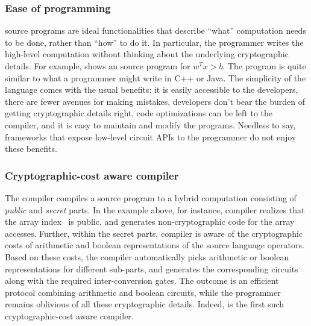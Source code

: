 \subsubsection{Ease of programming} \tool source programs are ideal
functionalities that describe ``what'' computation needs to be done,
rather than ``how'' to do it. In particular, the programmer writes the
high-level computation without thinking about the underlying
cryptographic details. For example, 
shows an \tool source
program for $w^Tx >b$. The program is quite similar to what a programmer might
write in C++ or Java. The simplicity of the
language comes with the usual benefits: it is easily accessible to the
developers, there are fewer avenues for making mistakes, developers
don't bear the burden of getting cryptographic details right, 
code optimizations can be left to the compiler,
and it
is easy to maintain and modify the programs. Needless to say,
frameworks that expose low-level circuit APIs to the programmer do not
enjoy these benefits.

\subsubsection{Cryptographic-cost aware compiler} The \tool compiler
compiles a source program to a hybrid computation consisting
of \emph{public} and \emph{secret} parts. In the example above, for
instance, \tool compiler realizes that the array index~ is
public, and generates non-cryptographic code for the array accesses.
Further, within the secret parts, \tool compiler is
aware
of the cryptographic costs of arithmetic and boolean representations
of the source language operators. Based on these costs, the compiler
automatically picks arithmetic or boolean
representations for different sub-parts, and generates the
corresponding circuits along with the required inter-conversion
gates. The outcome is an efficient \mpc protocol combining arithmetic
and boolean circuits, while the programmer remains
oblivious of all these cryptographic details. Indeed, \tool is the
first such cryptographic-cost aware compiler.

